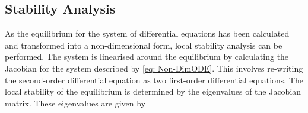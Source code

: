 \subsection{Stability Analysis}







As the equilibrium for the system of differential equations has been calculated and transformed into a non-dimensional form, local stability analysis can be performed. The system is linearised around the equilibrium by calculating the Jacobian for the system described by \cref{eq: Non-DimODE}. This involves re-writing the second-order differential equation as two first-order differential equations. The local stability of the equilibrium is determined by the eigenvalues of the Jacobian matrix. These eigenvalues are given by

